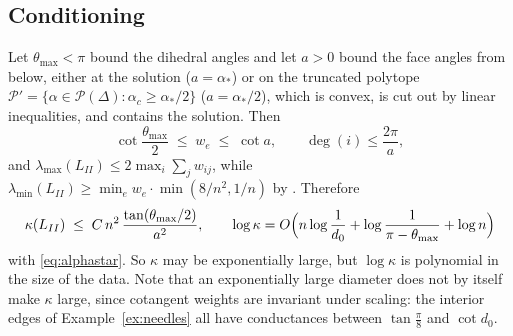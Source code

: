\documentclass[11pt]{amsart}
\theoremstyle{definition}
\theoremstyle{remark}
\begin{document}
\subsection{Conditioning}
Let $\theta_{\max}<\pi$ bound the dihedral angles and let $a>0$ bound the face angles from below, either at the solution \textup{(}$a=\alpha_*$\textup{)} or on the truncated polytope $\mathcal P'=\{\alpha\in\mathcal P(\Delta):\alpha_c\ge\alpha_*/2\}$ \textup{(}$a=\alpha_*/2$\textup{)},
which is convex, is cut out by linear inequalities, and contains the solution. Then
\[
\cot\frac{\theta_{\max}}2\;\le\;w_e\;\le\;\cot a,\qquad \deg(i)\le\frac{2\pi}{a},
\]
and $\lambda_{\max}(L_{II})\le2\max_i\sum_jw_{ij}$, while $\lambda_{\min}(L_{II})\ge\min_ew_e\cdot\min(8/n^2,1/n)$ by \cite[Lemma~6.1]{STsolve}. Therefore
\begin{equation}\label{eq:kappa}
\kappa(L_{II})\;\le\;C\,n^2\,\frac{\tan(\theta_{\max}/2)}{a^{2}},\qquad
\log\kappa=O\Bigl(n\log\frac1{d_0}+\log\frac1{\pi-\theta_{\max}}+\log n\Bigr)
\end{equation}
with \eqref{eq:alphastar}. So $\kappa$ may be exponentially large, but $\log\kappa$ is polynomial in the size of the data. Note that an exponentially large diameter does not by itself make $\kappa$ large, since cotangent weights are invariant under scaling: the interior edges of Example~\ref{ex:needles} all have conductances between $\tan\frac\pi8$ and $\cot d_0$.
\end{document}
